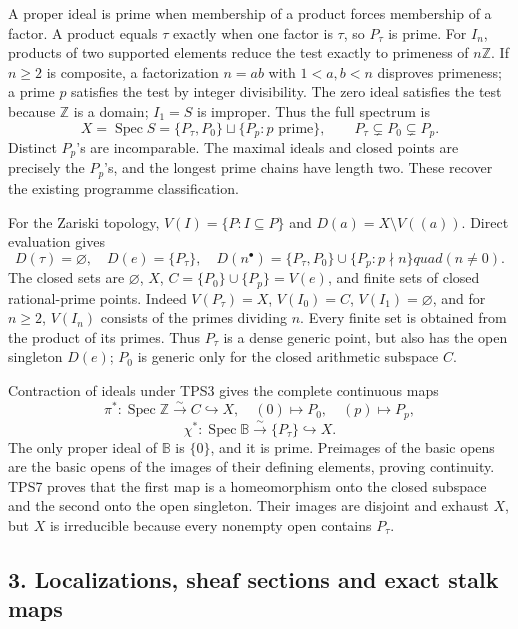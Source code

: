 \documentclass[
  10pt,
]{article}
\newcounter{none} %
\begin{document}
A proper ideal is prime when membership of a product forces membership
of a factor. A product equals \(\tau\) exactly when one factor is
\(\tau\), so \(P_\tau\) is prime. For \(I_n\), products of two supported
elements reduce the test exactly to primeness of \(n\mathbb Z\). If
\(n\ge2\) is composite, a factorization \(n=ab\) with \(1<a,b<n\)
disproves primeness; a prime \(p\) satisfies the test by integer
divisibility. The zero ideal satisfies the test because \(\mathbb Z\) is
a domain; \(I_1=S\) is improper. Thus the full spectrum is \[
\boxed{X=\operatorname{Spec}S=\{P_\tau,P_0\}\sqcup\{P_p:p\text{ prime}\},
\qquad P_\tau\subsetneq P_0\subsetneq P_p.}
\tag{TPS6}
\] Distinct \(P_p\)'s are incomparable. The maximal ideals and closed
points are precisely the \(P_p\)'s, and the longest prime chains have
length two. These recover the existing programme classification.

For the Zariski topology, \(V(I)=\{P:I\subseteq P\}\) and
\(D(a)=X\setminus V((a))\). Direct evaluation gives \[
D(\tau)=\varnothing,\quad D(e)=\{P_\tau\},\quad
D(n^\bullet)=\{P_\tau,P_0\}\cup\{P_p:p\nmid n\}quad(n\ne0).
\tag{TPS7}
\] The closed sets are \(\varnothing\), \(X\),
\(C=\{P_0\}\cup\{P_p\}=V(e)\), and finite sets of closed rational-prime
points. Indeed \(V(P_\tau)=X\), \(V(I_0)=C\), \(V(I_1)=\varnothing\),
and for \(n\ge2\), \(V(I_n)\) consists of the primes dividing \(n\).
Every finite set is obtained from the product of its primes. Thus
\(P_\tau\) is a dense generic point, but also has the open singleton
\(D(e)\); \(P_0\) is generic only for the closed arithmetic subspace
\(C\).

Contraction of ideals under TPS3 gives the complete continuous maps \[
\pi^*:\operatorname{Spec}\mathbb Z\xrightarrow{\sim}C\hookrightarrow X,
\quad (0)\mapsto P_0,\quad(p)\mapsto P_p,
\] \[
\chi^*:\operatorname{Spec}\mathbb B\xrightarrow{\sim}\{P_\tau\}\hookrightarrow X.
\tag{TPS8}
\] The only proper ideal of \(\mathbb B\) is \(\{0\}\), and it is prime.
Preimages of the basic opens are the basic opens of the images of their
defining elements, proving continuity. TPS7 proves that the first map is
a homeomorphism onto the closed subspace and the second onto the open
singleton. Their images are disjoint and exhaust \(X\), but \(X\) is
irreducible because every nonempty open contains \(P_\tau\).

\subsection{3. Localizations, sheaf sections and exact stalk
maps}\label{localizations-sheaf-sections-and-exact-stalk-maps}
\end{document}

